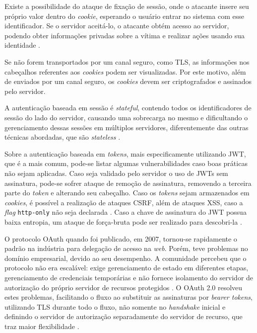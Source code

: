 Existe a possibilidade do ataque de fixação de sessão, onde o atacante insere seu próprio valor
dentro do \emph{cookie}, esperando o usuário entrar no sistema com esse identificador. Se o servidor
aceitá-lo, o atacante obtém acesso ao servidor, podendo obter informações privadas sobre a vítima
e realizar ações usando sua identidade \cite{DRHOVA2018}.

Se não forem transportados por um canal seguro, como TLS, as informações nos cabeçalhos referentes 
aos \emph{cookies} podem ser visualizadas. Por este motivo, além de enviados por um canal seguro, 
os \emph{cookies} devem ser criptografados e assinados pelo servidor\cite{RFC6265}.

A autenticação baseada em sessão é \emph{stateful}, contendo todos os identificadores de sessão do
lado do servidor, causando uma sobrecarga no mesmo e dificultando o gerenciamento dessas sessões em
múltiplos servidores, diferentemente das outras técnicas abordadas, que são \emph{stateless} 
\cite{BALAJ2017}.


Sobre a autenticação baseada em \emph{tokens}, mais especificamente utilizando JWT, que é a mais 
comum, pode-se listar algumas vulnerabilidades caso boas práticas não sejam aplicadas. Caso seja
validado pelo servidor o uso de JWTs sem assinatura, pode-se sofrer ataque de remoção de assinatura,
removendo a terceira parte do \emph{token} e alterando seu cabeçalho. Caso os \emph{tokens} sejam
armazenados em \emph{cookies}, é possível a realização de ataques CSRF, além de ataques XSS, caso a
\emph{flag} \texttt{http-only} não seja declarada \cite{PEYROTT2018}. Caso a chave de assinatura
do JWT possua baixa entropia, um ataque de força-bruta pode ser realizado para descobri-la 
\cite{RFC7515}.

O protocolo OAuth quando foi publicado, em 2007, tornou-se rapidamente o padrão na indústria para 
delegação de acesso na \emph{web}. Porém, teve problemas no domínio empresarial, devido ao seu desempenho. 
A comunidade percebeu que o protocolo não era escalável: exige gerenciamento de estado em diferentes 
etapas, gerenciamento de credenciais temporárias e não fornece isolamento do servidor de autorização 
do próprio servidor de recursos protegidos \cite{NOUREDDINE2011}. O OAuth 2.0 resolveu estes 
problemas, facilitando o fluxo ao substituir as assinaturas por \emph{bearer tokens}, utilizando TLS 
durante todo o fluxo, não somente no \emph{handshake} inicial e definindo o servidor de autorização 
separadamente do servidor de recurso, que traz maior flexibilidade \cite{SIRIWARDENA2014}.

